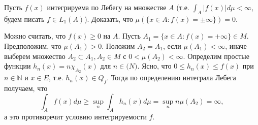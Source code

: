 \begin{task}{4}
Пусть $f(x)$ интегрируема по Лебегу на множестве $A$ (т.е. $\int_A|f(x)|d\mu < \infty$, будем писать $f \in L_1(A)$). Доказать, что $\mu(\lbrace x \in A : f(x) = \pm \infty \rbrace) = 0$.
\end{task}

\begin{solution} 
Можно считать, что $f(x) \geqslant 0$ на $A$. Пусть $A_1 = \lbrace x \in A : f(x) = +\infty\rbrace \in M$. Предположим, что $\mu(A_1) > 0$. Положим $A_2 = A_1$, если $\mu(A_1) < \infty$, иначе выберем множество $A_2 \subset A_1, A_2 \in M$ с $0 < \mu(A_2) < \infty$. Определим простые функции $h_n(x) = n\chi_{A_2}(x)$ для $n \in \mathbb(N)$. Ясно, что $0 \leqslant h_n(x) \leqslant f(x)$ при $n \in \mathbb{N}$ и $x \in E$, т.е. $h_n(x) \in Q_f$. Тогда по определению интеграла Лебега получаем, что 
\[
\int_A f(x)d\mu \geqslant \sup_n \int_A h_n(x)d\mu = \sup_n n\mu(A_2) = \infty,
\]
а это противоречит условию интегрируемости $f$.
\end{solution}